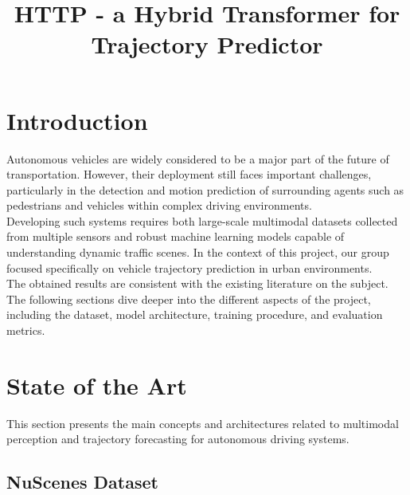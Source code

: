 \documentclass[conference]{IEEEtran}
\begin{document}
\title{HTTP - a Hybrid Transformer for Trajectory Predictor}

\author{
\and
{}
\and
{}
}

\maketitle


\section{Introduction}
Autonomous vehicles are widely considered to be a major part of the future of transportation. However, their deployment still faces important challenges, particularly in the detection and motion prediction of surrounding agents such as pedestrians and vehicles within complex driving environments.
\\

Developing such systems requires both large-scale multimodal datasets collected from multiple sensors and robust machine learning models capable of understanding dynamic traffic scenes. In the context of this project, our group focused specifically on vehicle trajectory prediction in urban environments.
\\

The obtained results are consistent with the existing literature on the subject. The following sections dive deeper into the different aspects of the project, including the dataset, model architecture, training procedure, and evaluation metrics.

\section{State of the Art}

This section presents the main concepts and architectures related to multimodal perception and trajectory forecasting for autonomous driving systems.

\subsection{NuScenes Dataset}
\end{document}
